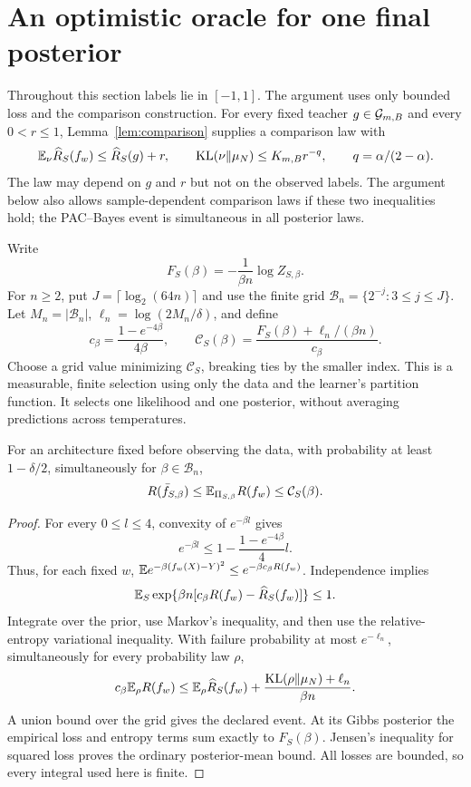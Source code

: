 \section{An optimistic oracle for one final posterior}
\label{sec:statistics}
Throughout this section labels lie in $[-1,1]$. The argument uses only bounded loss and the comparison construction. For every fixed teacher $g\in\mathcal G_{m,B}$ and every $0<r\le1$, Lemma~\ref{lem:comparison} supplies a comparison law with
\begin{equation}
 \mathbb E_\nu\widehat R_S(f_w)\le\widehat R_S(g)+r,
 \qquad \operatorname{KL}(\nu\Vert\mu_N)\le K_{m,B}r^{-q},
 \qquad q=\alpha/(2-\alpha).
 \label{eq:stat-comparison}
\end{equation}
The law may depend on $g$ and $r$ but not on the observed labels. The argument below also allows sample-dependent comparison laws if these two inequalities hold; the PAC--Bayes event is simultaneous in all posterior laws.

Write
\[
 F_S(\beta)=-\frac1{\beta n}\log Z_{S,\beta}.
\]
For $n\ge2$, put $J=\lceil\log_2(64n)\rceil$ and use the finite grid
$\mathcal B_n=\{2^{-j}:3\le j\le J\}$. Let $M_n=|\mathcal B_n|$,
$\ell_n=\log(2M_n/\delta)$, and define
\begin{equation}
 c_\beta=\frac{1-e^{-4\beta}}{4\beta},\qquad
 \mathcal C_S(\beta)=
 \frac{F_S(\beta)+\ell_n/(\beta n)}{c_\beta}.
 \label{eq:multiplicative-certificate}
\end{equation}
Choose a grid value minimizing $\mathcal C_S$, breaking ties by the smaller index. This is a measurable, finite selection using only the data and the learner's partition function. It selects one likelihood and one posterior, without averaging predictions across temperatures.

\begin{lemma}
\label{lem:multiplicative-PAC}
For an architecture fixed before observing the data, with probability at least $1-\delta/2$, simultaneously for $\beta\in\mathcal B_n$,
\[
 R(\bar f_{S,\beta})\le\mathbb E_{\Pi_{S,\beta}}R(f_w)
                   \le\mathcal C_S(\beta).
\]
\end{lemma}
\begin{proof}
For every $0\le l\le4$, convexity of $e^{-\beta l}$ gives
\[
 e^{-\beta l}\le1-\frac{1-e^{-4\beta}}4l.
\]
Thus, for each fixed $w$,
$\mathbb E e^{-\beta(f_w(X)-Y)^2}\le e^{-\beta c_\beta R(f_w)}$.
Independence implies
\[
 \mathbb E_S\exp\{\beta n[c_\beta R(f_w)-\widehat R_S(f_w)]\}\le1.
\]
Integrate over the prior, use Markov's inequality, and then use the relative-entropy variational inequality. With failure probability at most $e^{-\ell_n}$, simultaneously for every probability law $\rho$,
\[
 c_\beta\mathbb E_\rho R(f_w)\le\mathbb E_\rho\widehat R_S(f_w)
       +\frac{\operatorname{KL}(\rho\Vert\mu_N)+\ell_n}{\beta n}.
\]
A union bound over the grid gives the declared event. At its Gibbs posterior the empirical loss and entropy terms sum exactly to $F_S(\beta)$. Jensen's inequality for squared loss proves the ordinary posterior-mean bound. All losses are bounded, so every integral used here is finite.
\end{proof}

